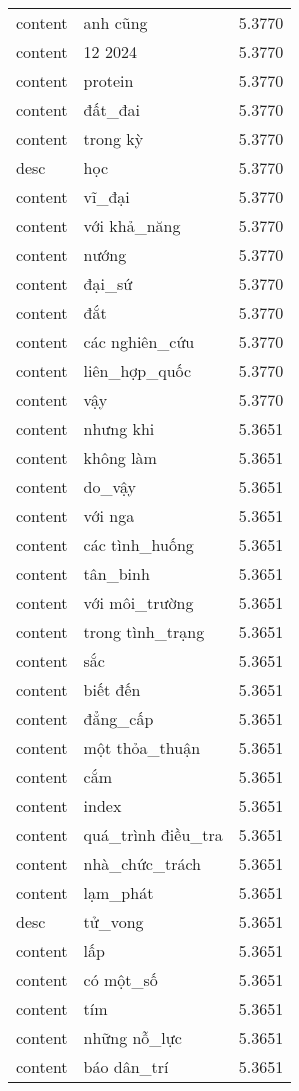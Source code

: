 \documentclass{article}
\begin{document}
\begin{tabular}{lll}
content & anh cũng & 5.3770\\
content & 12 2024 & 5.3770\\
content & protein & 5.3770\\
content & đất\_đai & 5.3770\\
content & trong kỳ & 5.3770\\
desc & học & 5.3770\\
content & vĩ\_đại & 5.3770\\
content & với khả\_năng & 5.3770\\
content & nướng & 5.3770\\
content & đại\_sứ & 5.3770\\
content & đắt & 5.3770\\
content & các nghiên\_cứu & 5.3770\\
content & liên\_hợp\_quốc & 5.3770\\
content & vậy & 5.3770\\
content & nhưng khi & 5.3651\\
content & không làm & 5.3651\\
content & do\_vậy & 5.3651\\
content & với nga & 5.3651\\
content & các tình\_huống & 5.3651\\
content & tân\_binh & 5.3651\\
content & với môi\_trường & 5.3651\\
content & trong tình\_trạng & 5.3651\\
content & sắc & 5.3651\\
content & biết đến & 5.3651\\
content & đẳng\_cấp & 5.3651\\
content & một thỏa\_thuận & 5.3651\\
content & cắm & 5.3651\\
content & index & 5.3651\\
content & quá\_trình điều\_tra & 5.3651\\
content & nhà\_chức\_trách & 5.3651\\
content & lạm\_phát & 5.3651\\
desc & tử\_vong & 5.3651\\
content & lấp & 5.3651\\
content & có một\_số & 5.3651\\
content & tím & 5.3651\\
content & những nỗ\_lực & 5.3651\\
content & báo dân\_trí & 5.3651\\

\end{tabular}
\end{document}
